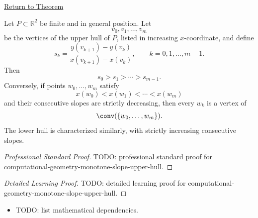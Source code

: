 \newpage
{}
\label{prf:computational-geometry-monotone-slope-upper-hull}

\begin{remark*}[Return]
\hyperref[thm:computational-geometry-monotone-slope-upper-hull]{Return to Theorem}

\end{remark*}

\begin{theorem*}
Let \(P\subset\mathbb{R}^2\) be finite and in general position. Let
\[
  v_0,v_1,\dots,v_m
\]
be the vertices of the upper hull of \(P\), listed in increasing
\(x\)-coordinate, and define
\[
  s_k
  =
  \frac{y(v_{k+1})-y(v_k)}{x(v_{k+1})-x(v_k)},
  \qquad
  k=0,1,\dots,m-1.
\]
Then
\[
  s_0>s_1>\cdots>s_{m-1}.
\]
Conversely, if points \(w_0,\dots,w_m\) satisfy
\[
  x(w_0)<x(w_1)<\cdots<x(w_m)
\]
and their consecutive slopes are strictly decreasing, then every \(w_k\) is a
vertex of
\[
  \conv(\{w_0,\dots,w_m\}).
\]
The lower hull is characterized similarly, with strictly increasing consecutive
slopes.
\end{theorem*}

\begin{proof}[Professional Standard Proof]
\LRAProofBodyStart
TODO: professional standard proof for computational-geometry-monotone-slope-upper-hull.
\end{proof}

\begin{proof}[Detailed Learning Proof]
\LRAProofBodyStart
TODO: detailed learning proof for computational-geometry-monotone-slope-upper-hull.
\end{proof}

\begin{remark*}
\end{remark*}

\begin{dependencies}
\begin{itemize}
  \item TODO: list mathematical dependencies.
\end{itemize}
\end{dependencies}

\clearpage
